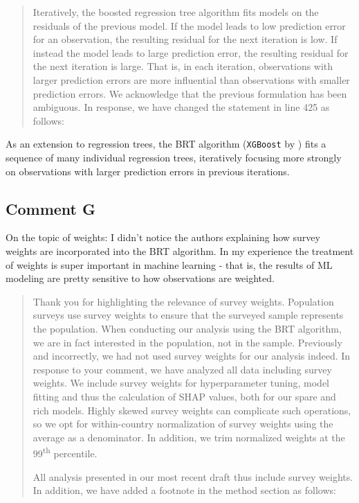 \documentclass[11pt]{article}
\newenvironment{response}
{\begin{quote}\color{black}}
{\end{quote}}
\begin{document}
\begin{response}
    Iteratively, the boosted regression tree algorithm fits models on the residuals of the previous model. If the model leads to low prediction error for an observation, the resulting residual for the next iteration is low. If instead the model leads to large prediction error, the resulting residual for the next iteration is large. That is, in each iteration, observations with larger prediction errors are more influential than observations with smaller prediction errors. We acknowledge that the previous formulation has been ambiguous. In response, we have changed the statement in line 425 as follows:
\end{response}

\begin{revisionbox}
    As an extension to regression trees, the BRT algorithm (\texttt{XGBoost} by \textcite{Chen.2016}) fits a sequence of many individual regression trees, iteratively focusing more strongly on observations with larger prediction errors in previous iterations.
\end{revisionbox}

\subsection*{Comment G}\label{comment_R1_G}

\begin{commentbox}
    On the topic of weights: I didn't notice the authors explaining how survey weights are incorporated into the BRT algorithm. In my experience the treatment of weights is super important in machine learning - that is, the results of ML modeling are pretty sensitive to how observations are weighted.
\end{commentbox}

\begin{response}

    Thank you for highlighting the relevance of survey weights. Population surveys use survey weights to ensure that the surveyed sample represents the population. When conducting our analysis using the BRT algorithm, we are in fact interested in the population, not in the sample. Previously and incorrectly, we had not used survey weights for our analysis indeed. In response to your comment, we have analyzed all data including survey weights. We include survey weights for hyperparameter tuning, model fitting and thus the calculation of SHAP values, both for our spare and rich models. Highly skewed survey weights can complicate such operations, so we opt for within-country normalization of survey weights using the average as a denominator. In addition, we trim normalized weights at the 99\textsuperscript{th} percentile.

    All analysis presented in our most recent draft thus include survey weights. In addition, we have added a footnote in the method section as follows:

\end{response}
\end{document}
